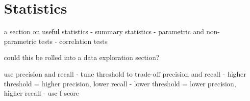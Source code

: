 
\section{Statistics} 
\label{advanced:statistics}

a section on useful statistics
- summary statistics
- parametric and non-parametric tests
- correlation tests



could this be rolled into a data exploration section?



use precision and recall
- tune threshold to trade-off precision and recall
	- higher threshold = higher precision, lower recall
	- lower threshold = lower precision, higher recall
- use f score